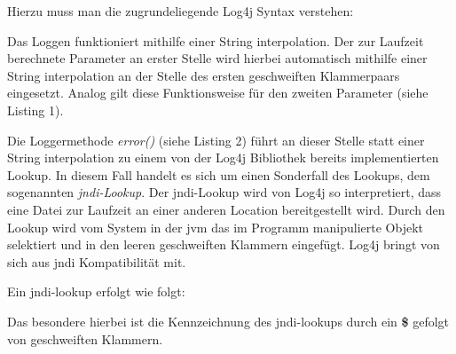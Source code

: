 Hierzu muss man die zugrundeliegende Log4j Syntax verstehen:

\bigskip

Das Loggen funktioniert mithilfe einer String interpolation. Der zur Laufzeit berechnete Parameter an erster Stelle wird hierbei automatisch
mithilfe einer String interpolation an der Stelle des ersten geschweiften Klammerpaars eingesetzt. Analog gilt diese Funktionsweise für den zweiten Parameter (siehe Listing 1).

Die Loggermethode \textit{error()} (siehe Listing 2) führt an dieser Stelle statt einer String interpolation zu einem von der Log4j Bibliothek bereits implementierten Lookup.
In diesem Fall handelt es sich um einen Sonderfall des Lookups, dem sogenannten \textit{\gls{jndi}-Lookup}. Der \gls{jndi}-Lookup wird von Log4j so interpretiert, dass eine Datei zur Laufzeit
an einer anderen Location bereitgestellt wird.
Durch den Lookup wird vom System in der \gls{jvm} das im Programm manipulierte Objekt selektiert und in den leeren geschweiften Klammern eingefügt.
Log4j bringt von sich aus \gls{jndi} Kompatibilität mit.

\newpage

Ein \gls{jndi}-lookup erfolgt wie folgt:

\bigskip

Das besondere hierbei ist die Kennzeichnung des \gls{jndi}-lookups durch ein \textbf{\$} gefolgt von geschweiften Klammern.